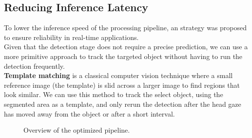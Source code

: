\documentclass{article}
\begin{document}
\subsection{Reducing Inference Latency}
To lower the inference speed of the processing pipeline, an strategy was proposed to ensure reliability in real-time applications.\\

Given that the detection stage does not require a precise prediction, we can use a more primitive approach to track the targeted object without having to run the detection frequently.\\

\textbf{Template matching} is a classical computer vision technique where a small reference image (the template) is slid across a larger image to find regions that look similar. We can use this method to track the select object, using the segmented area as a template, and only rerun the detection after the head gaze has moved away from the object or after a short interval.

\begin{figure}[htbp]
\centering
{}
\caption{Overview of the optimized pipeline.}
\label{fig:pipeline-overview}
\end{figure}
\end{document}
